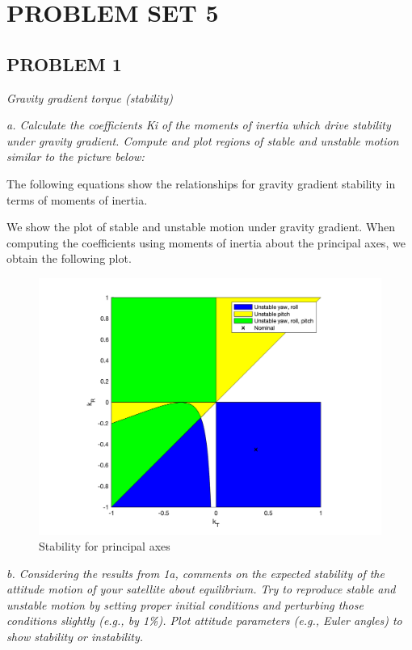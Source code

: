 \section{\Large PROBLEM SET 5}
\subsection{PROBLEM 1}
\textit{Gravity gradient torque (stability)}

\textit{a. Calculate the coefficients Ki of the moments of inertia which drive stability under gravity gradient. Compute and plot regions of stable and unstable motion similar to the picture below:}

The following equations show the relationships for gravity gradient stability in terms of moments of inertia.


We show the plot of stable and unstable motion under gravity gradient. When computing the coefficients using moments of inertia about the principal axes, we obtain the following plot.

\begin{figure}[H]
\centering
\includegraphics[scale=0.6]{Images/ps5_problem1a.png}
\caption{Stability for principal axes}
\label{fig:ps5_problem1a}
\end{figure}

\textit{b. Considering the results from 1a, comments on the expected stability of the attitude motion of your satellite about equilibrium. Try to reproduce stable and unstable motion by setting proper initial conditions and perturbing those conditions slightly (e.g., by 1\%). Plot attitude parameters (e.g., Euler angles) to show stability or instability.}


